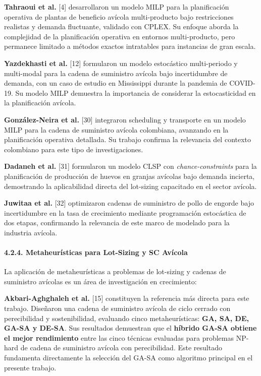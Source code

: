 \documentclass[
  spanish,
  12pt,
]{article}
\begin{document}
\textbf{Tahraoui et al.} {[}4{]} desarrollaron un modelo MILP para la
planificación operativa de plantas de beneficio avícola multi-producto
bajo restricciones realistas y demanda fluctuante, validado con CPLEX.
Su enfoque aborda la complejidad de la planificación operativa en
entornos multi-producto, pero permanece limitado a métodos exactos
intratables para instancias de gran escala.

\textbf{Yazdekhasti et al.} {[}12{]} formularon un modelo estocástico
multi-periodo y multi-modal para la cadena de suministro avícola bajo
incertidumbre de demanda, con un caso de estudio en Mississippi durante
la pandemia de COVID-19. Su modelo MILP demuestra la importancia de
considerar la estocasticidad en la planificación avícola.

\textbf{González-Neira et al.} {[}30{]} integraron scheduling y
transporte en un modelo MILP para la cadena de suministro avícola
colombiana, avanzando en la planificación operativa detallada. Su
trabajo confirma la relevancia del contexto colombiano para este tipo de
investigaciones.

\textbf{Dadaneh et al.} {[}31{]} formularon un modelo CLSP con
\emph{chance-constraints} para la planificación de producción de huevos
en granjas avícolas bajo demanda incierta, demostrando la aplicabilidad
directa del lot-sizing capacitado en el sector avícola.

\textbf{Juwitaa et al.} {[}32{]} optimizaron cadenas de suministro de
pollo de engorde bajo incertidumbre en la tasa de crecimiento mediante
programación estocástica de dos etapas, confirmando la relevancia de
este marco de modelado para la industria avícola.

\paragraph{4.2.4. Metaheurísticas para Lot-Sizing y SC
Avícola}\label{metaheuruxedsticas-para-lot-sizing-y-sc-avuxedcola}

La aplicación de metaheurísticas a problemas de lot-sizing y cadenas de
suministro avícolas es un área de investigación en crecimiento:

\textbf{Akbari-Aghghaleh et al.} {[}15{]} constituyen la referencia más
directa para este trabajo. Diseñaron una cadena de suministro avícola de
ciclo cerrado con perecibilidad y sostenibilidad, evaluando cinco
metaheurísticas: \textbf{GA, SA, DE, GA-SA y DE-SA}. Sus resultados
demuestran que el \textbf{híbrido GA-SA obtiene el mejor rendimiento}
entre las cinco técnicas evaluadas para problemas NP-hard de cadena de
suministro avícola con perecibilidad. Este resultado fundamenta
directamente la selección del GA-SA como algoritmo principal en el
presente trabajo.
\end{document}
